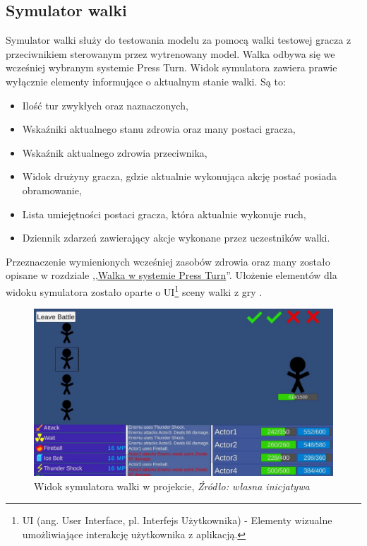 \documentclass{SGGW-thesis}
\begin{document}
\subsection{Symulator walki}
Symulator walki służy do testowania modelu za pomocą walki testowej gracza z przeciwnikiem sterowanym przez wytrenowany model. Walka odbywa się we wcześniej wybranym systemie Press Turn.
Widok symulatora zawiera prawie wyłącznie elementy informujące o aktualnym stanie walki. Są to:
\begin{itemize}
  \item Ilość tur zwykłych oraz naznaczonych,
  \item Wskaźniki aktualnego stanu zdrowia oraz many postaci gracza,
  \item Wskaźnik aktualnego zdrowia przeciwnika,
  \item Widok drużyny gracza, gdzie aktualnie wykonująca akcję postać posiada obramowanie,
  \item Lista umiejętności postaci gracza, która aktualnie wykonuje ruch,
  \item Dziennik zdarzeń zawierający akcje wykonane przez uczestników walki.
\end{itemize}
Przeznaczenie wymienionych wcześniej zasobów zdrowia oraz many zostało opisane w rozdziale ,,\hyperref[systempressturn]{Walka w systemie Press Turn}''.
Ułożenie elementów dla widoku symulatora zostało oparte o UI\footnote{UI (ang. User Interface, pl. Interfejs Użytkownika) - Elementy wizualne umożliwiające interakcję użytkownika z aplikacją.} sceny walki z gry \cite{SMT3}. 
\begin{figure}[H]
  \includegraphics[width=1\textwidth]{battlescreen.JPG}
  \caption{Widok symulatora walki w projekcie, \textit{Źródło: własna inicjatywa}}
\end{figure}
\end{document}
